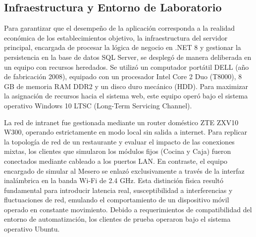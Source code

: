 \subsection{Infraestructura y Entorno de Laboratorio}

Para garantizar que el desempeño de la aplicación corresponda a la realidad económica de los establecimientos objetivo, la infraestructura del servidor principal, encargada de procesar la lógica de negocio en .NET 8 y gestionar la persistencia en la base de datos SQL Server, se desplegó de manera deliberada en un equipo con recursos heredados. Se utilizó un computador portátil DELL (año de fabricación 2008), equipado con un procesador Intel Core 2 Duo (T8000), 8 GB de memoria RAM DDR2 y un disco duro mecánico (HDD). Para maximizar la asignación de recursos hacia el sistema web, este equipo operó bajo el sistema operativo Windows 10 LTSC (Long-Term Servicing Channel).

La red de intranet fue gestionada mediante un router doméstico ZTE ZXV10 W300, operando estrictamente en modo local sin salida a internet. Para replicar la topología de red de un restaurante y evaluar el impacto de las conexiones mixtas, los clientes que simularon los módulos fijos (Cocina y Caja) fueron conectados mediante cableado a los puertos LAN. En contraste, el equipo encargado de simular al Mesero se enlazó exclusivamente a través de la interfaz inalámbrica en la banda Wi-Fi de 2.4 GHz. Esta distinción física resultó fundamental para introducir latencia real, susceptibilidad a interferencias y fluctuaciones de red, emulando el comportamiento de un dispositivo móvil operado en constante movimiento. Debido a requerimientos de compatibilidad del entorno de automatización, los clientes de prueba operaron bajo el sistema operativo Ubuntu.

